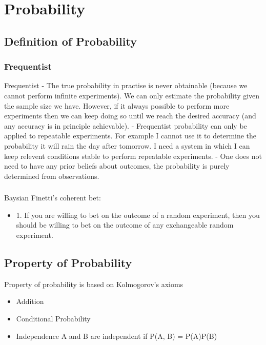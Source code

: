 \documentclass[12pt,a4paper]{article}
\begin{document}
\section{Probability}
\subsection{Definition of Probability}
    \subsubsection{Frequentist}
        Frequentist
        - The true probability in practise is never obtainable (because we cannot perform infinite experiments). We can only estimate the probability given the sample size we have. However, if it always possible to perform more experiments then we can keep doing so until we reach the desired accuracy (and any accuracy is in principle achievable).
        - Frequentist probability can only be applied to repeatable experiments. For example I cannot use it to determine the probability it will rain the day after tomorrow. I need a system in which I can keep relevent conditions stable to perform repeatable experiments.
        - One does not need to have any prior beliefs about outcomes, the probability is purely determined from observations.

    \subsubsection{}
        Baysian
    Finetti's coherent bet:
    \begin{itemize}
        \item 1. If you are willing to bet on the outcome of a random experiment, then you should be willing to bet on the outcome of any exchangeable random experiment.
    \end{itemize}



\subsection{Property of Probability}
    Property of probability is based on Kolmogorov's axioms
    \begin{itemize}
        \item Addition
        \item Conditional Probability
        \item Independence
            A and B are independent if P(A, B) = P(A)P(B)

    \end{itemize}
\end{document}
